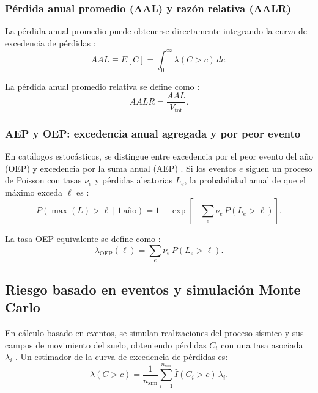 \subsubsection{Pérdida anual promedio (AAL) y razón relativa (AALR)}

La pérdida anual promedio puede obtenerse directamente integrando la curva de excedencia de pérdidas \cite{McGuire2004,BakerBradleyStafford2021}:
\begin{equation}
AAL \equiv E[C] = \int_{0}^{\infty} \lambda(C > c)\, dc.
\label{eq:average_annual_loss_v2}
\end{equation}

La pérdida anual promedio relativa se define como \cite{McGuire2004}:
\begin{equation}
AALR = \frac{AAL}{V_{\text{tot}}}.
\label{eq:aalr_def}
\end{equation}

\subsubsection{AEP y OEP: excedencia anual agregada y por peor evento}

En catálogos estocásticos, se distingue entre excedencia por el peor evento del año (OEP) y excedencia por la suma anual (AEP) \cite{GrossiKunreuther2005,MitchellWallaceEtAl2017}. Si los eventos \(e\) siguen un proceso de Poisson con tasas \(\nu_e\) y pérdidas aleatorias \(L_e\), la probabilidad anual de que el máximo exceda \(\ell\) es \cite{GrossiKunreuther2005,MitchellWallaceEtAl2017}:
\begin{equation}
P(\max(L) > \ell \mid 1\,\text{año}) = 1 - \exp\left[-\sum_{e}\nu_e\,P(L_e > \ell)\right].
\label{eq:oep_probability}
\end{equation}

La tasa OEP equivalente se define como \cite{GrossiKunreuther2005}:
\begin{equation}
\lambda_{\text{OEP}}(\ell) = \sum_{e}\nu_e\,P(L_e > \ell).
\label{eq:oep_rate}
\end{equation}


\subsection{Riesgo basado en eventos y simulación Monte Carlo}

En cálculo basado en eventos, se simulan realizaciones del proceso sísmico y sus campos de movimiento del suelo, obteniendo pérdidas \(C_i\) con una tasa asociada \(\lambda_i\) \cite{SilvaEtAl2014}. Un estimador de la curva de excedencia de pérdidas es:
\begin{equation}
\lambda(C > c) = \frac{1}{n_{\text{sim}}}\sum_{i=1}^{n_{\text{sim}}}\hat{I}(C_i > c)\,\lambda_i.
\label{eq:monte_carlo_risk_v2}
\end{equation}
